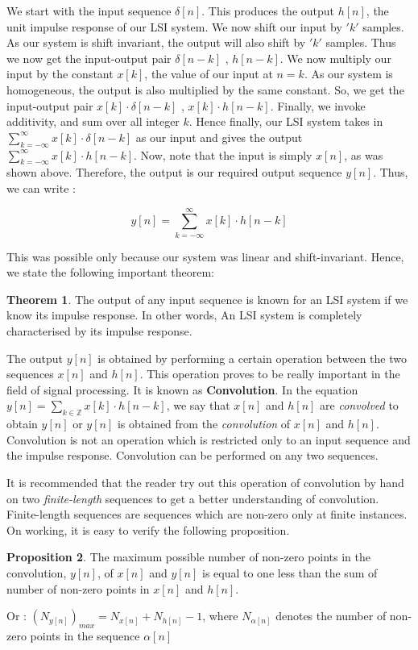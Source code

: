 \documentclass{article}
\theoremstyle{definition}
\newtheorem{theorem}{Theorem}[subsection]
\newtheorem{prop}[theorem]{Proposition}
\begin{document}
	 We start with the input sequence $\delta[n]$. This produces the output $h[n]$, the unit impulse response of our LSI system. We now shift our input by $'k'$ samples. As our system is shift invariant, the output will also shift by $'k'$ samples. Thus we now get the input-output pair $\delta[n-k]$ , $h[n-k]$. We now multiply our input by the constant $x[k]$, the value of our input at $n=k$. As our system is homogeneous, the output is also multiplied by the same constant. So, we get the input-output pair $x[k]\cdot \delta[n-k]$ , $x[k] \cdot h[n-k]$. Finally, we invoke additivity, and sum over all integer $k$. Hence finally, our LSI system takes in $\sum_{k=-\infty}^{\infty} x[k] \cdot \delta[n-k]$ as our input and gives the output $\sum_{k=-\infty}^{\infty} x[k] \cdot h[n-k]$. Now, note that the input is simply $x[n]$, as was shown above. Therefore, the output is our required output sequence $y[n]$. Thus, we can write : 
	 
	 \[
	 	\boxed{y[n] = \sum_{k=-\infty}^{\infty} x[k]\cdot h[n-k]}
	 \]
	 
	 This was possible only because our system was linear and shift-invariant. Hence, we state the following important theorem:
	 
	 \begin{theorem}
	 The output of any input sequence is known for an LSI system if we know its impulse response. In other words, An LSI system is completely characterised by its impulse response.
\end{theorem}	  

The output $y[n]$ is obtained by performing a certain operation between the two sequences $x[n]$ and $h[n]$. This operation proves to be really important in the field of signal processing. It is known as \textbf{Convolution}. In the equation $y[n] = \sum_{k \in \mathbb{Z}} x[k] \cdot h[n-k]$, we say that $x[n]$ and $h[n]$ are \textit{convolved} to obtain $y[n]$ or $y[n]$ is obtained from the \textit{convolution} of $x[n]$ and $h[n]$. Convolution is not an operation which is restricted only to an input sequence and the impulse response. Convolution can be performed on any two sequences. \smallskip

It is recommended that the reader try out this operation of convolution by hand on two \textit{finite-length} sequences to get a better understanding of convolution. Finite-length sequences are sequences which are non-zero only at finite instances. On working, it is easy to verify the following proposition.

\begin{prop}
The maximum possible number of non-zero points in the convolution, $y[n]$, of $x[n]$ and $y[n]$ is equal to one less than the sum of number of non-zero points in $x[n]$ and $h[n]$.

Or : $(N_{y[n]})_{max} = N_{x[n]} + N_{h[n]} - 1$, where $N_{\alpha[n]}$ denotes the number of non-zero points in the sequence $\alpha[n]$
\end{prop}
\end{document}
